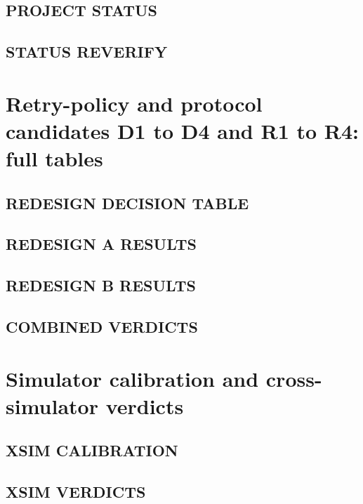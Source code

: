 \documentclass[10pt,a4paper]{article}
\begin{document}
\subsection{PROJECT STATUS}


\subsection{STATUS REVERIFY}


\section{Retry-policy and protocol candidates D1 to D4 and R1 to R4: full tables}

\subsection{REDESIGN DECISION TABLE}


\subsection{REDESIGN A RESULTS}


\subsection{REDESIGN B RESULTS}


\subsection{COMBINED VERDICTS}


\section{Simulator calibration and cross-simulator verdicts}

\subsection{XSIM CALIBRATION}


\subsection{XSIM VERDICTS}

\end{document}
